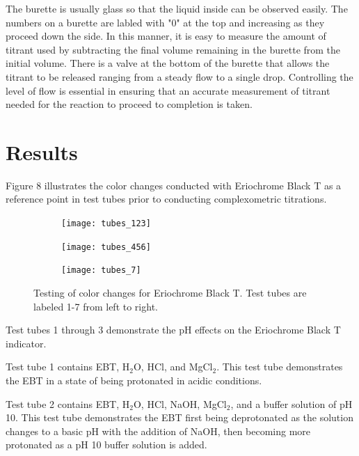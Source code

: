 \documentclass{article}
\begin{document}
\begin{center}
\end{center}

The burette is usually glass so that the liquid inside can be observed easily.  The numbers on a
burette are labled with "0" at the top and increasing as they proceed down the side. In this manner,
it is easy to measure the amount of titrant used by subtracting the final volume remaining in the
burette from the initial volume. There is a valve at the bottom of the burette that allows the
titrant to be released ranging from a steady flow to a single drop. Controlling the level of flow is
essential in ensuring that an accurate measurement of titrant needed for the reaction to proceed to
completion is taken.


\section {Results}

Figure 8 illustrates the color changes conducted with Eriochrome Black T as a
reference point in test tubes prior to conducting complexometric titrations.

\begin{figure}[!hb]
\centering
        \begin{subfigure}{.3\textwidth}
        \centering
                \texttt{[image: tubes\_123]}
        \end{subfigure}%
        \begin{subfigure}{.3\textwidth}
                \centering
                \texttt{[image: tubes\_456]}
        \end{subfigure}%
        \begin{subfigure}{.3\textwidth}
                \centering
                \texttt{[image: tubes\_7]}
        \end{subfigure}%
        \caption{Testing of color changes for Eriochrome Black T. Test tubes are
        labeled 1-7 from left to right.}
\end{figure}

Test tubes 1 through 3 demonstrate the pH effects on the Eriochrome Black T
indicator.

Test tube 1 contains EBT, H$_2$O, HCl, and MgCl$_2$.
This test tube demonstrates the EBT in a state of being protonated in acidic
conditions.

Test tube 2 contains EBT, H$_2$O, HCl, NaOH, MgCl$_2$, and a buffer solution of pH 10.
This test tube demonstrates the EBT first being deprotonated as the solution changes
to a basic pH with the addition of NaOH, then becoming more protonated as a pH
10 buffer solution is added.
\end{document}

